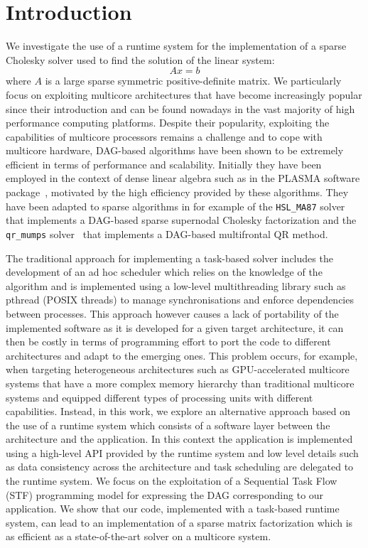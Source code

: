 \documentclass{article}
\begin{document}
\newpage
\setcounter{page}{1}

\section{Introduction} \label{sec:introduction} 



We investigate the use of a runtime system for the implementation of a
sparse Cholesky solver used to find the solution of the linear system:
\begin{equation}\label{eq:linear-system}
  Ax = b
\end{equation}
where $A$ is a large sparse symmetric positive-definite matrix. We
particularly focus on exploiting multicore architectures that have
become increasingly popular since their introduction and can be found
nowadays in the vast majority of high performance computing
platforms. Despite their popularity, exploiting the capabilities of
multicore processors remains a challenge and to cope with multicore
hardware, DAG-based algorithms have been shown to be extremely
efficient in terms of performance and scalability. Initially they have
been employed in the context of dense linear algebra such as in the
PLASMA software package~\cite{a.d.d.h.ea:09}, motivated by the high
efficiency provided by these algorithms. They have been adapted to
sparse algorithms in for example of the \texttt{HSL\_MA87}
solver~\cite{h.r.s:10} that implements a DAG-based sparse supernodal
Cholesky factorization and the \texttt{qr\_mumps} solver~\cite{b:13}
that implements a DAG-based multifrontal QR method.

The traditional approach for implementing a task-based solver includes
the development of an ad hoc scheduler which relies on the knowledge
of the algorithm and is implemented using a low-level multithreading
library such as pthread (POSIX threads) to manage synchronisations and
enforce dependencies between processes. This approach however causes a
lack of portability of the implemented software as it is developed for
a given target architecture, it can then be costly in terms of
programming effort to port the code to different architectures and
adapt to the emerging ones. This problem occurs, for example, when
targeting heterogeneous architectures such as GPU-accelerated
multicore systems that have a more complex memory hierarchy than
traditional multicore systems and equipped different types of
processing units with different capabilities. Instead, in this work,
we explore an alternative approach based on the use of a runtime
system which consists of a software layer between the architecture and
the application. In this context the application is implemented using
a high-level API provided by the runtime system and low level details
such as data consistency across the architecture and task scheduling
are delegated to the runtime system. We focus on the exploitation of a
Sequential Task Flow (STF) programming model for expressing the DAG
corresponding to our application. We show that our code, implemented
with a task-based runtime system, can lead to an implementation of a
sparse matrix factorization which is as efficient as a
state-of-the-art solver on a multicore system.
\end{document}
